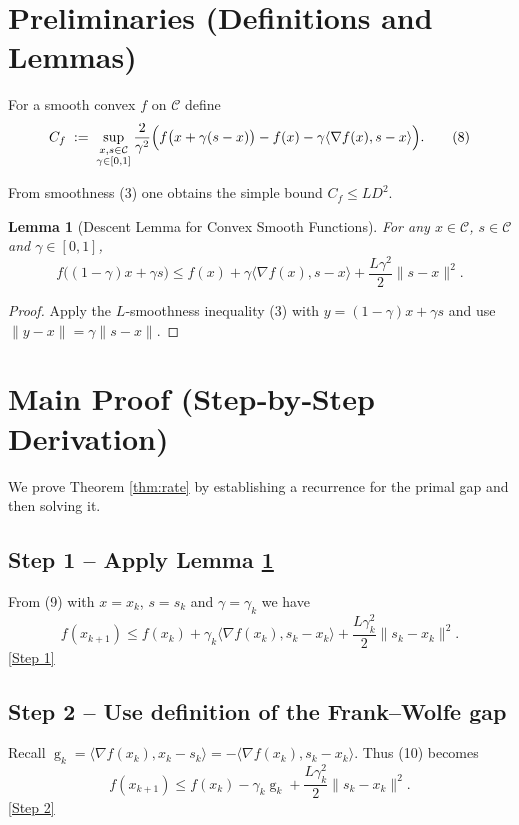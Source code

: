 \documentclass{article}
\newtheorem{lemma}{Lemma}
\newcommand{\gap}{\operatorname{g}}
\begin{document}
\section*{Preliminaries (Definitions and Lemmas)}
\begin{definition}\label{def:curvature}
For a smooth convex $f$ on $\mathcal{C}$ define
\[
C_f \;:=\; \sup_{\substack{x,s\in\mathcal{C}\\ \gamma\in[0,1]}}
\frac{2}{\gamma^2}\Bigl(
f\bigl(x+\gamma (s-x)\bigr)-f(x)-\gamma\langle\nabla f(x),s-x\rangle
\Bigr).
\tag{8}
\]
\end{definition}
From smoothness (3) one obtains the simple bound $C_f\le L D^2$.

\begin{lemma}[Descent Lemma for Convex Smooth Functions]\label{lem:descent}
For any $x\in\mathcal{C}$, $s\in\mathcal{C}$ and $\gamma\in[0,1]$,
\[
f\bigl((1-\gamma)x+\gamma s\bigr)
\le f(x)+\gamma\langle\nabla f(x),s-x\rangle+\frac{L\gamma^2}{2}\|s-x\|^2 .
\tag{9}
\]
\end{lemma}
\begin{proof}
Apply the $L$‑smoothness inequality (3) with $y=(1-\gamma)x+\gamma s$ and use $\|y-x\|=\gamma\|s-x\|$.
\end{proof}

\section*{Main Proof (Step‑by‑Step Derivation)}
We prove Theorem \ref{thm:rate} by establishing a recurrence for the primal gap and then solving it.

\subsection*{Step 1 – Apply Lemma \ref{lem:descent}}
From (9) with $x=x_k$, $s=s_k$ and $\gamma=\gamma_k$ we have
\[
f(x_{k+1})
\le f(x_k)+\gamma_k\langle\nabla f(x_k),s_k-x_k\rangle
      +\frac{L\gamma_k^{2}}{2}\|s_k-x_k\|^{2}.
\tag{10}
\]
\underline{[Step 1]}

\subsection*{Step 2 – Use definition of the Frank–Wolfe gap}
Recall $\gap_k = \langle\nabla f(x_k),x_k-s_k\rangle = -\langle\nabla f(x_k),s_k-x_k\rangle$.
Thus (10) becomes
\[
f(x_{k+1}) \le f(x_k)-\gamma_k\gap_k
               +\frac{L\gamma_k^{2}}{2}\|s_k-x_k\|^{2}.
\tag{11}
\]
\underline{[Step 2]}
\end{document}
